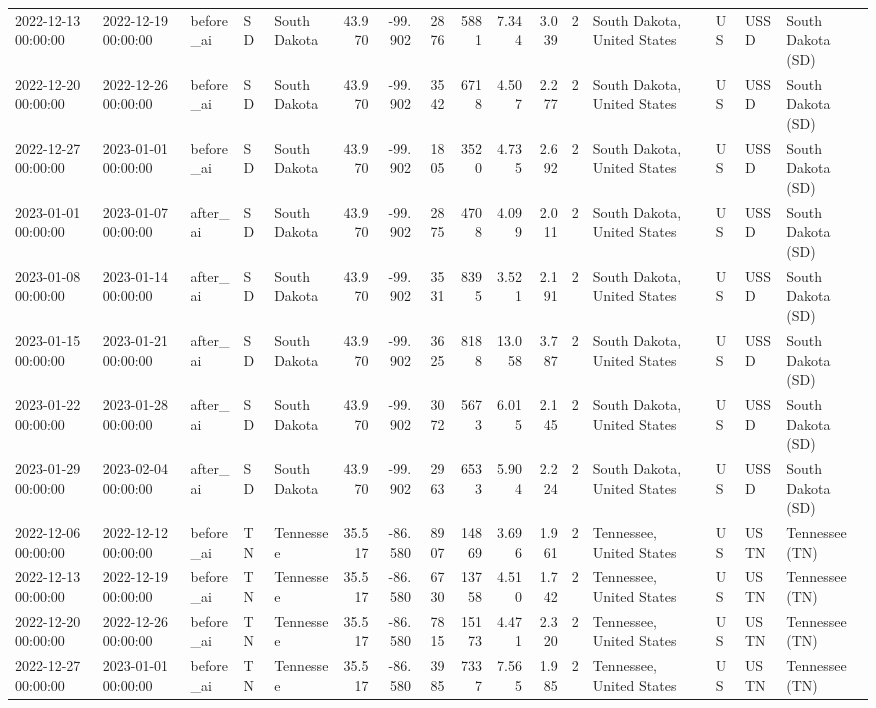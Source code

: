 \begin{tabular}{lllllrrrrrrlllll}
2022-12-13 00:00:00 & 2022-12-19 00:00:00 & before\_ai & SD & South Dakota & 43.970 & -99.902 & 2876 & 5881 & 7.344 & 3.039 & 2 & South Dakota, United States & US & USSD & South Dakota (SD) \\
2022-12-20 00:00:00 & 2022-12-26 00:00:00 & before\_ai & SD & South Dakota & 43.970 & -99.902 & 3542 & 6718 & 4.507 & 2.277 & 2 & South Dakota, United States & US & USSD & South Dakota (SD) \\
2022-12-27 00:00:00 & 2023-01-01 00:00:00 & before\_ai & SD & South Dakota & 43.970 & -99.902 & 1805 & 3520 & 4.735 & 2.692 & 2 & South Dakota, United States & US & USSD & South Dakota (SD) \\
2023-01-01 00:00:00 & 2023-01-07 00:00:00 & after\_ai & SD & South Dakota & 43.970 & -99.902 & 2875 & 4708 & 4.099 & 2.011 & 2 & South Dakota, United States & US & USSD & South Dakota (SD) \\
2023-01-08 00:00:00 & 2023-01-14 00:00:00 & after\_ai & SD & South Dakota & 43.970 & -99.902 & 3531 & 8395 & 3.521 & 2.191 & 2 & South Dakota, United States & US & USSD & South Dakota (SD) \\
2023-01-15 00:00:00 & 2023-01-21 00:00:00 & after\_ai & SD & South Dakota & 43.970 & -99.902 & 3625 & 8188 & 13.058 & 3.787 & 2 & South Dakota, United States & US & USSD & South Dakota (SD) \\
2023-01-22 00:00:00 & 2023-01-28 00:00:00 & after\_ai & SD & South Dakota & 43.970 & -99.902 & 3072 & 5673 & 6.015 & 2.145 & 2 & South Dakota, United States & US & USSD & South Dakota (SD) \\
2023-01-29 00:00:00 & 2023-02-04 00:00:00 & after\_ai & SD & South Dakota & 43.970 & -99.902 & 2963 & 6533 & 5.904 & 2.224 & 2 & South Dakota, United States & US & USSD & South Dakota (SD) \\
2022-12-06 00:00:00 & 2022-12-12 00:00:00 & before\_ai & TN & Tennessee & 35.517 & -86.580 & 8907 & 14869 & 3.696 & 1.961 & 2 & Tennessee, United States & US & USTN & Tennessee (TN) \\
2022-12-13 00:00:00 & 2022-12-19 00:00:00 & before\_ai & TN & Tennessee & 35.517 & -86.580 & 6730 & 13758 & 4.510 & 1.742 & 2 & Tennessee, United States & US & USTN & Tennessee (TN) \\
2022-12-20 00:00:00 & 2022-12-26 00:00:00 & before\_ai & TN & Tennessee & 35.517 & -86.580 & 7815 & 15173 & 4.471 & 2.320 & 2 & Tennessee, United States & US & USTN & Tennessee (TN) \\
2022-12-27 00:00:00 & 2023-01-01 00:00:00 & before\_ai & TN & Tennessee & 35.517 & -86.580 & 3985 & 7337 & 7.565 & 1.985 & 2 & Tennessee, United States & US & USTN & Tennessee (TN) \\

\end{tabular}
